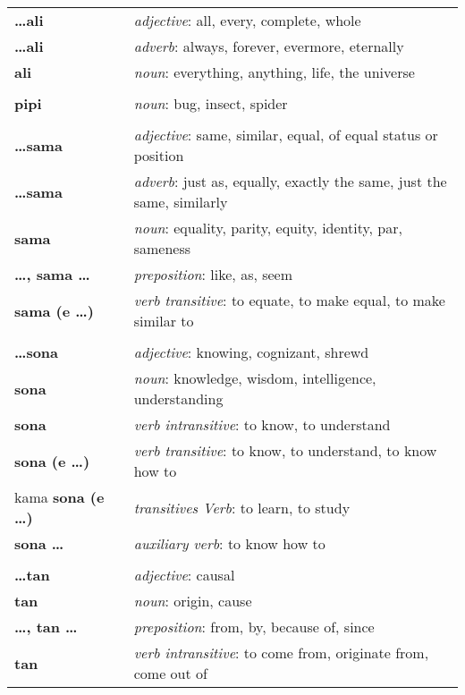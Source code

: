 \begin{supertabular}{p{2,5cm}|ll}
\textbf{\dots ali} && \textit{adjective}: all, every, complete, whole \\ %
\textbf{\dots ali} && \textit{adverb}: always, forever, evermore, eternally \\ %
\textbf{ali} && \textit{noun}: everything, anything, life, the universe \\ %
 && \\ %
\textbf{pipi} && \textit{noun}: bug, insect, spider \\ %
 && \\ %
\textbf{\dots sama} && \textit{adjective}: same, similar, equal, of equal status or position \\ %
\textbf{\dots sama} && \textit{adverb}: just as, equally, exactly the same, just the same, similarly \\ %
\textbf{sama} && \textit{noun}: equality, parity, equity, identity, par, sameness \\ %
\textbf{\dots , sama \dots} && \textit{preposition}: like, as, seem \\ %
\textbf{sama (e \dots)} && \textit{verb transitive}: to equate, to make equal, to make similar to \\ %
 && \\ %
\textbf{\dots sona} && \textit{adjective}: knowing, cognizant, shrewd \\ %
\textbf{sona} && \textit{noun}: knowledge, wisdom, intelligence, understanding \\ %
\textbf{sona} && \textit{verb intransitive}: to know, to understand \\ %
\textbf{sona (e \dots)} && \textit{verb transitive}: to know, to understand, to know how to \\ %
kama \textbf{sona (e \dots)} && \textit{transitives Verb}: to learn, to study \\ %
\textbf{sona \dots} && \textit{auxiliary verb}: to know how to \\ %
 && \\ %
\textbf{\dots tan} && \textit{adjective}: causal \\ %
\textbf{tan} && \textit{noun}: origin, cause \\ %
\textbf{\dots , tan \dots} && \textit{preposition}: from, by, because of, since \\ %
\textbf{tan} && \textit{verb intransitive}: to come from, originate from, come out of \\ %
\end{supertabular}
%
\newpage
